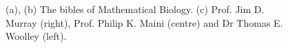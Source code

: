 \begin{figure}[!!!h!!!tb]
\caption{ \label{Books} (a), (b) The bibles of Mathematical Biology. (c) Prof. Jim D. Murray (right), Prof. Philip K. Maini (centre) and Dr Thomas E. Woolley (left).}
\end{figure}

